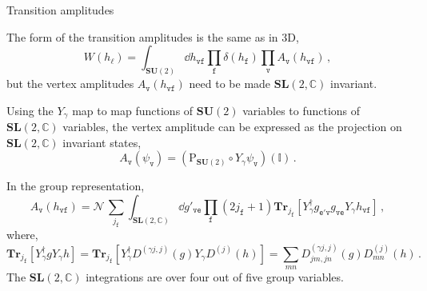 \documentclass{beamer}
\begin{document}
\begin{frame}{Transition amplitudes}
    \begin{list}{\maltese}{\leftmargin=1em \itemindent=0em}
        \item<1-> The form of the transition amplitudes is the same as in 3D,
        \begin{equation}
            W(h_\ell)=\int_{{\mathbf{SU}(2)}}\dd{h_\mathtt{vf}}\prod_\mathtt{f}\delta(h_\mathtt{f})\prod_\mathtt{v}A_\mathtt{v}(h_\mathtt{vf})\,,
        \end{equation}
        but the vertex amplitudes $A_\mathtt{v}(h_\mathtt{vf})$ need to be made $\mathbf{SL}(2,\mathbb{C})$ invariant.
        \item<2-> Using the $Y_\gamma$ map to map functions of $\mathbf{SU}(2)$ variables to functions of $\mathbf{SL}(2,\mathbb{C})$ variables, the vertex amplitude can be expressed as the projection on $\mathbf{SL}(2,\mathbb{C})$ invariant states,
        \begin{equation}
            A_\mathtt{v}(\psi_\mathtt{v})=(\operatorname{P_{\mathbf{SU}(2)}}\circ Y_\gamma\psi_\mathtt{v})(\mathbb{I})\,.
        \end{equation}
        \item<3-> In the group representation,
        \begin{equation}\label{vert_amp_4d}
            A_\mathtt{v}(h_\mathtt{vf})=\mathcal{N}\,\sum_{j_\mathtt{f}}\int_{{\mathbf{SL}(2,\mathbb{C})}}\dd{g'_\mathtt{ve}}\prod_\mathtt{f}(2j_\mathtt{f}+1)\mathbf{Tr}_{j_\mathtt{f}}[Y_\gamma^\dagger g_\mathtt{e'v}g_\mathtt{ve}Y_\gamma h_\mathtt{vf}]\,,
        \end{equation}
        where,
        \begin{equation*}
            \mathbf{Tr}_{j_\mathtt{f}}[Y_\gamma^\dagger g Y_\gamma h]=\mathbf{Tr}_{j_\mathtt{f}}[Y_\gamma^\dagger D^{(\gamma j,j)}(g) Y_\gamma D^{(j)}(h)]= \sum_{mn}D^{(\gamma j,j)}_{jm,jn}(g) D^{(j)}_{mn}(h)\,.
        \end{equation*}
        The $\mathbf{SL}(2,\mathbb{C})$ integrations are over four out of five group variables.
    \end{list}
\end{frame}
\end{document}
